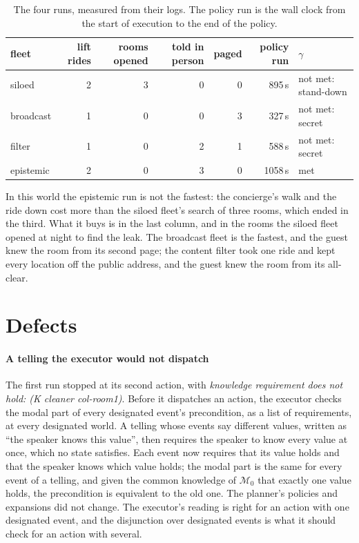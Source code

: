 \documentclass[11pt,a4paper]{article}
\theoremstyle{definition}
\newcommand{\Mod}{\mathcal{M}}
\begin{document}
\begin{table}[H]
\centering\small
\begin{tabular}{@{}l r r r r r l@{}}
\toprule
fleet & lift rides & rooms opened & told in person & paged & policy run & $\gamma$ \\
\midrule
siloed & 2 & 3 & 0 & 0 & 895\,s & not met: stand-down \\
broadcast & 1 & 0 & 0 & 3 & 327\,s & not met: secret \\
filter & 1 & 0 & 2 & 1 & 588\,s & not met: secret \\
epistemic & 2 & 0 & 3 & 0 & 1058\,s & met \\
\bottomrule
\end{tabular}
\caption{The four runs, measured from their logs. The policy run is the wall
clock from the start of execution to the end of the policy.}
\label{tab:measured}
\end{table}

In this world the epistemic run is not the fastest: the concierge's walk and the
ride down cost more than the siloed fleet's search of three rooms, which ended
in the third. What it buys is in the last column, and in the rooms the siloed
fleet opened at night to find the leak. The broadcast fleet is the fastest, and
the guest knew the room from its second page; the content filter took one ride
and kept every location off the public address, and the guest knew the room from
its all-clear.

\section{Defects}
\label{sec:defects}

\paragraph{A telling the executor would not dispatch}
The first run stopped at its second action, with \emph{knowledge requirement
does not hold: (K cleaner col-room1)}. Before it dispatches an action, the
executor checks the modal part of every designated event's precondition, as a
list of requirements, at every designated world. A telling whose events say
different values, written as ``the speaker knows this value'', then requires the
speaker to know every value at once, which no state satisfies. Each event now
requires that its value holds and that the speaker knows which value holds; the
modal part is the same for every event of a telling, and given the common
knowledge of $\Mod_0$ that exactly one value holds, the precondition is
equivalent to the old one. The planner's policies and expansions did not change.
The executor's reading is right for an action with one designated event, and the
disjunction over designated events is what it should check for an action with
several.
\end{document}
